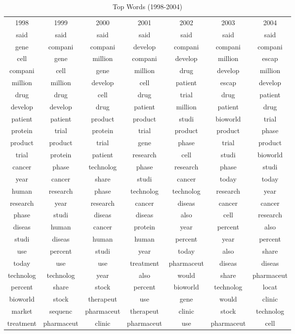 \begin{table}[p!]
\footnotesize
\begin{center}
\caption[Top Words (1998-2004)]{Top Words (1998-2004) \label{topwords2}}
\vspace{0.3in}
\begin{tabular}{ccccccc}
\hline 
\hline
1998 & 1999 & 2000 & 2001 & 2002 & 2003 & 2004 \\
said & said & said & said & said & said & said \\
gene & compani & compani & develop & compani & compani & compani \\
cell & gene & million & compani & develop & million & escap \\
compani & cell & gene & million & drug & develop & million \\
million & million & develop & cell & patient & escap & develop \\
drug & drug & cell & drug & trial & drug & patient \\
develop & develop & drug & patient & million & patient & drug \\
patient & patient & product & product & studi & bioworld & trial \\
protein & trial & protein & trial & product & product & phase \\
product & product & trial & gene & phase & trial & product \\
trial & protein & patient & research & cell & studi & bioworld \\
cancer & phase & technolog & phase & research & phase & studi \\
year & cancer & share & studi & cancer & today & today \\
human & research & phase & technolog & technolog & research & year \\
research & year & research & cancer & diseas & cancer & cancer \\
phase & studi & diseas & diseas & also & cell & research \\
diseas & human & cancer & protein & year & percent & also \\
studi & diseas & human & human & percent & year & percent \\
use & percent & studi & year & today & also & share \\
today & use & use & treatment & pharmaceut & diseas & diseas \\
technolog & technolog & year & also & would & share & pharmaceut \\
percent & share & stock & percent & bioworld & technolog & locat \\
bioworld & stock & therapeut & use & gene & would & clinic \\
market & sequenc & pharmaceut & therapeut & clinic & stock & technolog \\
treatment & pharmaceut & clinic & pharmaceut & use & pharmaceut & cell \\
\hline
\end{tabular}
\end{center}
\end{table}

